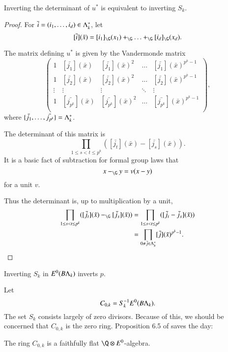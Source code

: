 \begin{lemma} \label{det}
Inverting the determinant of $u^*$ is equivalent to inverting $S_k$.
\end{lemma}
\begin{proof}
For $\bar{i} = (i_1, \ldots, i_d) \in \Lambda_k^*$, let
\[
[\bar{i}](\bar{x}) = [i_1]_{\G}(x_1) +_{\G} \ldots +_{\G} [i_d]_{\G}(x_d).
\]

The matrix defining $u^*$ is given by the Vandermonde matrix
\[
\left(
\begin{array}{ccccc}
1 & [\bar{j_1}](\bar{x}) & [\bar{j_1}](\bar{x})^2 & \ldots & [\bar{j_{1}}](\bar{x})^{p^k-1} \\
1 & [\bar{j_2}](\bar{x}) & [\bar{j_2}](\bar{x})^2 & \ldots & [\bar{j_{2}}](\bar{x})^{p^k-1}\\
\vdots & \vdots & \vdots & \ddots & \vdots \\
1 & [\bar{j_{p^k}}](\bar{x}) & [\bar{j_{p^k}}](\bar{x})^2 & \ldots & [\bar{j_{p^k}}](\bar{x})^{p^k-1}\\
\end{array} \right),
\]
where $\{\bar{j_1},\ldots,\bar{j_{p^k}}\} = \Lambda_k^*$.

The determinant of this matrix is
\[
\prod_{1 \leq s < t \leq p^k} ([\bar{j_t}](\bar{x}) - [\bar{j_s}](\bar{x})).
\]
It is a basic fact of subtraction for formal group laws that
\[
x -_{\G} y = v(x-y)
\]
for a unit $v$. 

Thus the determinant is, up to multiplication by a unit, 
\begin{align*}
\prod_{1 \leq s < t \leq p^k} ([\bar{j_t}](\bar{x}) -_{\G} [\bar{j_s}](\bar{x})) & = \prod_{1 \leq s < t \leq p^k} ([\bar{j_t} - \bar{j_s}](\bar{x})) \\
& = \prod_{0 \neq \bar{j} \in \Lk^*} [\bar{j}](\bar{x})^{p^k-1}. \qedhere
\end{align*} 
\end{proof}

\begin{corollary}
Inverting $S_k$ in $E^0(B\Lambda_k)$ inverts $p$.
\end{corollary}

Let 
\begin{equation} \label{c1}
C_{0,k} = S_{k}^{-1}E^0(B\Lambda_k).
\end{equation}
The set $S_k$ consists largely of zero divisors. Because of this, we should be concerned that $C_{0,k}$ is the zero ring. Proposition 6.5 of \cite{hkr} saves the day:

\begin{proposition}
The ring $C_{0,k}$ is a faithfully flat $\Q \otimes E^0$-algebra.
\end{proposition}

